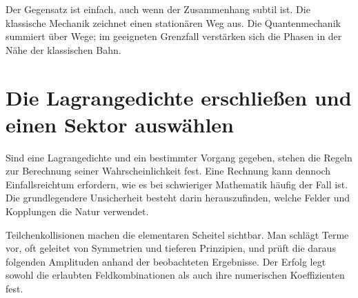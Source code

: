 Der Gegensatz ist einfach, auch wenn der Zusammenhang subtil ist. Die klassische Mechanik zeichnet einen stationären Weg aus. Die Quantenmechanik summiert über Wege; im geeigneten Grenzfall verstärken sich die Phasen in der Nähe der klassischen Bahn.

\section{Die Lagrangedichte erschließen und einen Sektor auswählen}

Sind eine Lagrangedichte und ein bestimmter Vorgang gegeben, stehen die Regeln zur Berechnung seiner Wahrscheinlichkeit fest. Eine Rechnung kann dennoch Einfallsreichtum erfordern, wie es bei schwieriger Mathematik häufig der Fall ist. Die grundlegendere Unsicherheit besteht darin herauszufinden, welche Felder und Kopplungen die Natur verwendet.

\begin{classroomqa}
\end{classroomqa}

Teilchenkollisionen machen die elementaren Scheitel sichtbar. Man schlägt Terme vor, oft geleitet von Symmetrien und tieferen Prinzipien, und prüft die daraus folgenden Amplituden anhand der beobachteten Ergebnisse. Der Erfolg legt sowohl die erlaubten Feldkombinationen als auch ihre numerischen Koeffizienten fest.

\begin{classroomqa}
\end{classroomqa}

